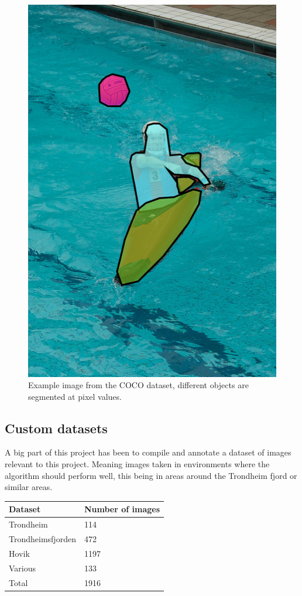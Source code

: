 \begin{figure}[h!]
    \centering
    \includegraphics[scale=0.5]{images/coco.png}
    \caption{Example image from the COCO dataset, different objects are segmented at pixel values.}
    \label{fig:coco}
\end{figure}

\subsection{Custom datasets}
A big part of this project has been to compile and annotate a dataset of images relevant to this project. Meaning images taken in environments where the algorithm should perform well, this being in areas around the Trondheim fjord or similar areas.


\begin{table}[h!]
\centering
\begin{tabular}{l|l}
Dataset           & Number of images \\ \hline
Trondheim         & 114              \\
Trondheimsfjorden & 472              \\
Hovik             & 1197             \\
Various           & 133              \\ \hline
Total             & 1916            
\end{tabular}
\end{table}

